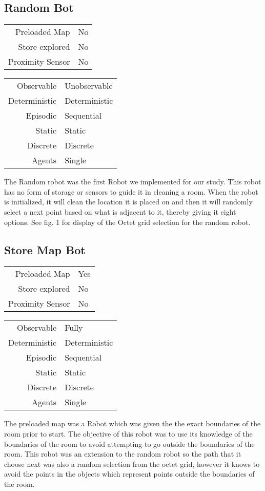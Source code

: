 \documentclass[letterpaper]{article}
\begin{document}
\subsection{Random Bot}

\begin{tabular}{ r | l }  
	Preloaded Map 		& No \\
	Store explored 		& No \\
	Proximity Sensor 	& No \\
\end{tabular}
\quad
\begin{tabular}{ r | l }  
	Observable		& Unobservable 	\\
	Deterministic	& Deterministic \\
	Episodic		& Sequential	\\
	Static		 	& Static 		\\
	Discrete 		& Discrete 		\\
	Agents		 	& Single 		\\
\end{tabular}
The Random robot was the first Robot we implemented for our study. This robot has no form of storage or sensors to guide it in cleaning a room. 
When the robot is initialized, it will clean the location it is placed on and then it will randomly select a next point based on what is adjacent to it, thereby giving it eight options. See fig. 1 for display of the Octet grid selection for the random robot. 



\subsection{Store Map Bot}

\begin{tabular}{ r | l }  
	Preloaded Map 		& Yes \\
	Store explored 		& No \\
	Proximity Sensor 	& No \\
\end{tabular}
\quad
\begin{tabular}{ r | l }  
	Observable 		& Fully 		\\
	Deterministic 	& Deterministic \\
	Episodic		& Sequential	\\
	Static		 	& Static 		\\
	Discrete 		& Discrete 		\\
	Agents		 	& Single 		\\	
\end{tabular}
The preloaded map was a Robot which was given the the exact boundaries of the room prior to start. The objective of this robot was to use its knowledge of the boundaries of the room to avoid attempting to go outside the boundaries of the room. This robot was an extension to the random robot so the path that it choose next was also a random selection from the octet grid, however it knows to avoid the points in the objects which represent points outside the boundaries of the room.
\end{document}
